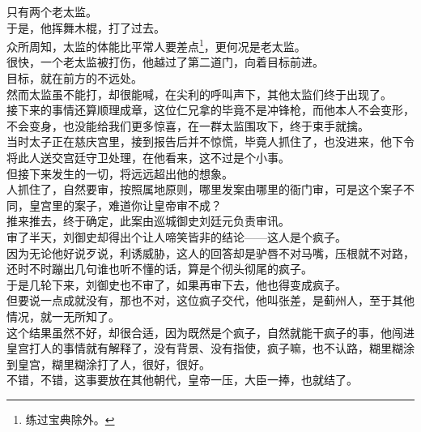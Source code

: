 \begin{multicols}{\theparacolNo}
只有两个老太监。\\

于是，他挥舞木棍，打了过去。\\

众所周知，太监的体能比平常人要差点\footnote{练过宝典除外。}，更何况是老太监。\\

很快，一个老太监被打伤，他越过了第二道门，向着目标前进。\\

目标，就在前方的不远处。\\

然而太监虽不能打，却很能喊，在尖利的呼叫声下，其他太监们终于出现了。\\

接下来的事情还算顺理成章，这位仁兄拿的毕竟不是冲锋枪，而他本人不会变形，不会变身，也没能给我们更多惊喜，在一群太监围攻下，终于束手就擒。\\

当时太子正在慈庆宫里，接到报告后并不惊慌，毕竟人抓住了，也没进来，他下令将此人送交宫廷守卫处理，在他看来，这不过是个小事。\\

但接下来发生的一切，将远远超出他的想象。\\

人抓住了，自然要审，按照属地原则，哪里发案由哪里的衙门审，可是这个案子不同，皇宫里的案子，难道你让皇帝审不成？\\

推来推去，终于确定，此案由巡城御史刘廷元负责审讯。\\

审了半天，刘御史却得出个让人啼笑皆非的结论——这人是个疯子。\\

因为无论他好说歹说，利诱威胁，这人的回答却是驴唇不对马嘴，压根就不对路，还时不时蹦出几句谁也听不懂的话，算是个彻头彻尾的疯子。\\

于是几轮下来，刘御史也不审了，如果再审下去，他也得变成疯子。\\

但要说一点成就没有，那也不对，这位疯子交代，他叫张差，是蓟州人，至于其他情况，就一无所知了。\\

这个结果虽然不好，却很合适，因为既然是个疯子，自然就能干疯子的事，他闯进皇宫打人的事情就有解释了，没有背景、没有指使，疯子嘛，也不认路，糊里糊涂到皇宫，糊里糊涂打了人，很好，很好。\\

不错，不错，这事要放在其他朝代，皇帝一压，大臣一捧，也就结了。\\


\end{multicols}
